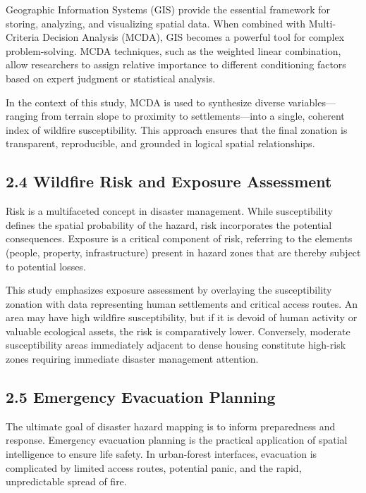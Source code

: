 \documentclass[12pt,a4paper]{article}
\begin{document}
Geographic Information Systems (GIS) provide the essential framework for storing, analyzing, and visualizing spatial data. When combined with Multi-Criteria Decision Analysis (MCDA), GIS becomes a powerful tool for complex problem-solving. MCDA techniques, such as the weighted linear combination, allow researchers to assign relative importance to different conditioning factors based on expert judgment or statistical analysis.


In the context of this study, MCDA is used to synthesize diverse variables—ranging from terrain slope to proximity to settlements—into a single, coherent index of wildfire susceptibility. This approach ensures that the final zonation is transparent, reproducible, and grounded in logical spatial relationships.



\subsection*{2.4 Wildfire Risk and Exposure Assessment}

Risk is a multifaceted concept in disaster management. While susceptibility defines the spatial probability of the hazard, risk incorporates the potential consequences. Exposure is a critical component of risk, referring to the elements (people, property, infrastructure) present in hazard zones that are thereby subject to potential losses.


This study emphasizes exposure assessment by overlaying the susceptibility zonation with data representing human settlements and critical access routes. An area may have high wildfire susceptibility, but if it is devoid of human activity or valuable ecological assets, the risk is comparatively lower. Conversely, moderate susceptibility areas immediately adjacent to dense housing constitute high-risk zones requiring immediate disaster management attention.



\subsection*{2.5 Emergency Evacuation Planning}

The ultimate goal of disaster hazard mapping is to inform preparedness and response. Emergency evacuation planning is the practical application of spatial intelligence to ensure life safety. In urban-forest interfaces, evacuation is complicated by limited access routes, potential panic, and the rapid, unpredictable spread of fire.
\end{document}
